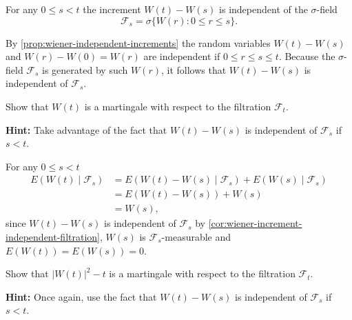 \begin{Corollary}
\label{cor:wiener-increment-independent-filtration}
For any $0 \leq s < t$ the increment $W(t) - W(s)$ is independent of the $\sigma$-field
\[
\mathcal{F}_s = \sigma\{W(r): 0 \leq r \leq s\}.
\]
\end{Corollary}

\begin{Proof}
By \cref{prop:wiener-independent-increments} the random variables $W(t) - W(s)$ and $W(r) - W(0) = W(r)$ are independent if $0 \leq r \leq s \leq t$. Because the $\sigma$-field $\mathcal{F}_s$ is generated by such $W(r)$, it follows that $W(t) - W(s)$ is independent of $\mathcal{F}_s$.
\end{Proof}

\begin{Exercise}
\label{ex:wiener-martingale}
Show that $W(t)$ is a martingale with respect to the filtration $\mathcal{F}_t$.

\noindent\textbf{Hint:} Take advantage of the fact that $W(t) - W(s)$ is independent of $\mathcal{F}_s$ if $s < t$.
\end{Exercise}

\begin{Solution}
For any $0 \leq s < t$
\begin{equation}
\begin{aligned}
E(W(t) \mid \mathcal{F}_s) &= E(W(t) - W(s) \mid \mathcal{F}_s) + E(W(s) \mid \mathcal{F}_s) \\
&= E(W(t) - W(s)) + W(s) \\
&= W(s),
\end{aligned}
\end{equation}
since $W(t) - W(s)$ is independent of $\mathcal{F}_s$ by \cref{cor:wiener-increment-independent-filtration}, $W(s)$ is $\mathcal{F}_s$-measurable and $E(W(t)) = E(W(s)) = 0$.
\end{Solution}

\begin{Exercise}
\label{ex:wiener-squared-martingale}
Show that $|W(t)|^2 - t$ is a martingale with respect to the filtration $\mathcal{F}_t$.

\noindent\textbf{Hint:} Once again, use the fact that $W(t) - W(s)$ is independent of $\mathcal{F}_s$ if $s < t$.
\end{Exercise}

